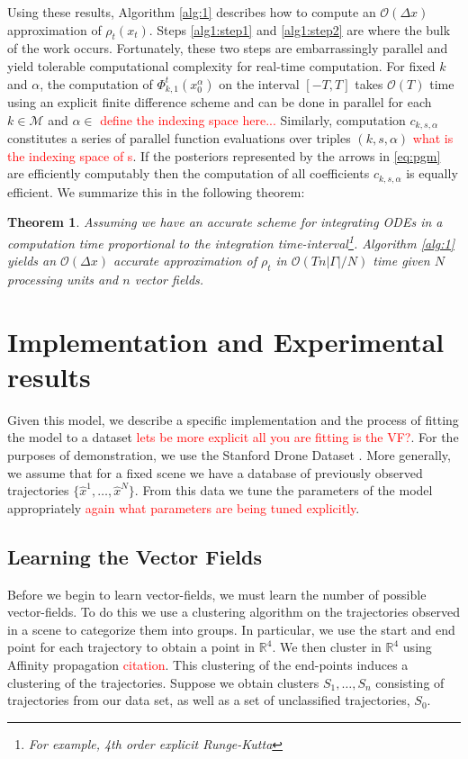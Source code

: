 \documentclass[letterpaper,10pt,conference]{ieeeconf}
\newtheorem{thm}{Theorem}
\newcommand{\Ram}[1]{\textcolor{red}{#1}}
\begin{document}
Using these results, Algorithm \ref{alg:1} describes how to compute an $\mathcal{O}( \Delta x)$ approximation of $\rho_t(x_t)$.
Steps \ref{alg1:step1} and \ref{alg1:step2} are where the bulk of the work occurs.
Fortunately, these two steps are embarrassingly parallel and yield tolerable computational complexity for real-time computation.
For fixed $k$ and $\alpha$, the computation of $\Phi_{k,1}^t(x_0^{\alpha})$ on the interval $[-T,T]$ takes $\mathcal{O}(T)$ time using an explicit finite difference scheme and can be done in parallel for each $k \in \mathcal{M}$ and $\alpha \in$ \Ram{define the indexing space here...}
Similarly, computation $c_{k,s,\alpha}$ constitutes a series of parallel function evaluations over triples $(k,s,\alpha)$ \Ram{what is the indexing space of s}.
If the posteriors represented by the arrows in \eqref{eq:pgm} are  efficiently computably then the computation of all coefficients $c_{k,s,\alpha}$ is equally efficient.
We summarize this in the following theorem:
\begin{thm}
	Assuming we have an accurate scheme for integrating ODEs in a computation time proportional to the integration time-interval\footnote{For example, 4th order explicit Runge-Kutta}.  Algorithm \ref{alg:1} yields an $\mathcal{O}( \Delta x)$ accurate approximation of $\rho_t$ in $\mathcal{O}( T n | \Gamma | / N )$ time given $N$ processing units and $n$ vector fields.
\end{thm}
  
\section{Implementation and Experimental results} \label{sec:implementation}
  Given this model, we describe a specific implementation and the process of fitting the model to a dataset \Ram{lets be more explicit all you are fitting is the VF?}.
  For the purposes of demonstration, we use the Stanford Drone Dataset \cite{Robicquet2016}.
  More generally, we assume that for a fixed scene we have a database of previously observed trajectories $\{ \hat{x}^1, \dots, \hat{x}^N\}$.
  From this data we tune the parameters of the model appropriately \Ram{again what parameters are being tuned explicitly}.
  
  \subsection{Learning the Vector Fields}
  Before we begin to learn vector-fields, we must learn the number of possible vector-fields.
  To do this we use a clustering algorithm on the trajectories observed in a scene to categorize them into groups.
  In particular, we use the start and end point for each trajectory to obtain a point in $\mathbb{R}^4$.
  We then cluster in $\mathbb{R}^4$ using Affinity propagation \Ram{citation}.
  This clustering of the end-points induces a clustering of the trajectories.
  Suppose we obtain clusters $S_1, \dots, S_n$ consisting of trajectories from our data set, as well as a set of unclassified trajectories, $S_0$.
  
\end{document}

